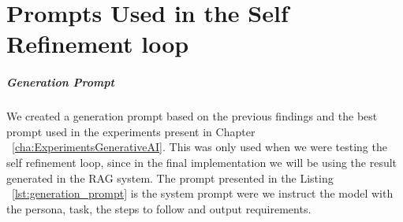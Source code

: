 
%


\appendix
\chapter{Prompts Used in the Self Refinement loop}\label{app:prompts}

\paragraph{Generation Prompt}
We created a generation prompt based on the previous findings and the best prompt used in the experiments present in Chapter ~\ref{cha:ExperimentsGenerativeAI}. This was only used when we were testing the self refinement loop, since in the final implementation we will be using the result generated in the RAG system. 
The prompt presented in the Listing ~\ref{lst:generation_prompt} is the system prompt were we instruct the model with the persona, task, the steps to follow and output requirements.


